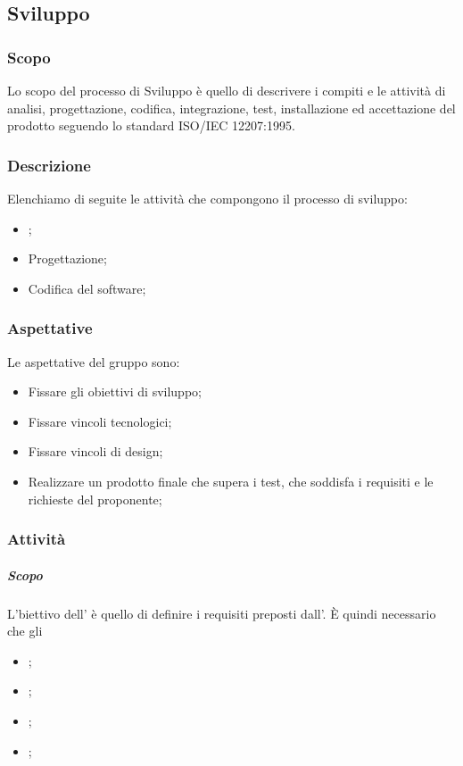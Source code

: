 \subsection{Sviluppo}
\subsubsection{Scopo}
Lo scopo del processo di Sviluppo è quello di descrivere i compiti e le attività di analisi, progettazione, codifica, integrazione, test, installazione ed accettazione del prodotto seguendo lo standard ISO/IEC 12207:1995.

\subsubsection{Descrizione}
Elenchiamo di seguite le attività che compongono il processo di sviluppo:
\begin{itemize}
    \item{\AdR{};}
    \item{Progettazione;}
    \item{Codifica del software;}
\end{itemize}

\subsubsection{Aspettative}
Le aspettative del gruppo sono:
\begin{itemize}
    \item{Fissare gli obiettivi di sviluppo;}
    \item{Fissare vincoli tecnologici;}
    \item{Fissare vincoli di design;}
    \item{Realizzare un prodotto finale che supera i test, che soddisfa i requisiti e le richieste del proponente;}
\end{itemize}

\subsubsection{Attività}
\paragraph{\AdR{}}
\subparagraph{Scopo} L'biettivo dell'\AdRv{} è quello di definire i requisiti preposti dall'\proponProg{}. È quindi necessario che gli \analProg
\begin{itemize}
    \item{;}
    \item{;}
    \item{;}
    \item{;}
\end{itemize}




